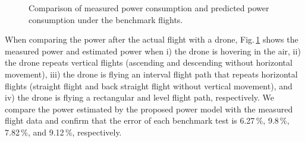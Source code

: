 \documentclass[journal]{./template/IEEEtran}
\begin{document}
\begin{figure}[h]
\caption{Comparison of measured power consumption and predicted power consumption under the benchmark flights.}

\label{fig: benchmark}
\end{figure}

When comparing the power after the actual flight with a drone, Fig.\,\ref{fig: benchmark} shows the measured power and estimated power when i) the drone is hovering in the air, ii) the drone repeats vertical flights (ascending and descending without horizontal movement), iii) the drone is flying an interval flight path that repeats horizontal flights (straight flight and back straight flight without vertical movement), and iv) the drone is flying a rectangular and level flight path, respectively. 
We compare the power estimated by the proposed power model with the measured flight data and confirm that the error of each benchmark test is 6.27\,\%, 9.8\,\%, 7.82\,\%, and 9.12\,\%, respectively.
\end{document}
